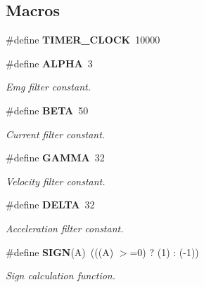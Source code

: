 \subsection*{Macros}
\begin{DoxyCompactItemize}
\item 
\mbox{\label{utils_8h_a05ec5d63e2ba7621d706137124efca7d}} 
\#define {\bfseries T\+I\+M\+E\+R\+\_\+\+C\+L\+O\+CK}~10000
\item 
\mbox{\label{utils_8h_af5abd28c44c29b7397c84f1fec4b1d84}} 
\#define \textbf{ A\+L\+P\+HA}~3
\begin{DoxyCompactList}\small\item\em Emg filter constant. \end{DoxyCompactList}\item 
\mbox{\label{utils_8h_a1b996515309fc3c03449912bb33046e3}} 
\#define \textbf{ B\+E\+TA}~50
\begin{DoxyCompactList}\small\item\em Current filter constant. \end{DoxyCompactList}\item 
\mbox{\label{utils_8h_a8659b9de3e544ff142b153b076f30fd5}} 
\#define \textbf{ G\+A\+M\+MA}~32
\begin{DoxyCompactList}\small\item\em Velocity filter constant. \end{DoxyCompactList}\item 
\mbox{\label{utils_8h_a3fd2b1bcd7ddcf506237987ad780f495}} 
\#define \textbf{ D\+E\+L\+TA}~32
\begin{DoxyCompactList}\small\item\em Acceleration filter constant. \end{DoxyCompactList}\item 
\mbox{\label{utils_8h_a8c7db0cde6d591a5abad279ba92ef021}} 
\#define \textbf{ S\+I\+GN}(A)~(((A) $>$=0) ? (1) \+: (-\/1))
\begin{DoxyCompactList}\small\item\em Sign calculation function. \end{DoxyCompactList}\end{DoxyCompactItemize}
